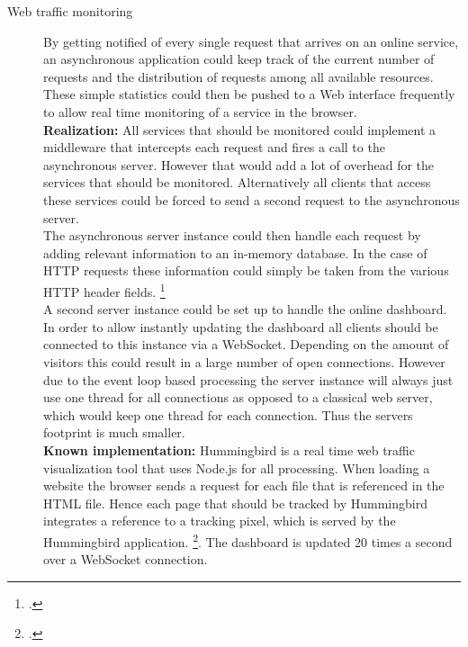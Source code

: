 \begin{description}
  \item[Web traffic monitoring] By getting notified of every single request that
  arrives on an online service, an asynchronous application could keep track of the
  current number of requests and the distribution of requests among all
  available resources. These simple statistics could then be pushed to a Web interface
  frequently to allow real time monitoring of a service in the browser.\\
  \textbf{Realization:} All services that should be monitored could implement a
  middleware that intercepts each request and fires a call to the asynchronous
  server. However that would add a lot of overhead for the services that should
  be monitored. Alternatively all clients that access these services could be forced to send a
  second request to the asynchronous server.\\
  The asynchronous server instance could then handle each request by adding
  relevant information to an in-memory database. In the case of HTTP requests
  these information could simply be taken from the various HTTP header fields.
  \footcite[Cf.][]{http_rfc}\\
  A second server instance could
  be set up to handle the online dashboard.
  In order to allow instantly updating the dashboard all clients should be
  connected to this instance via a WebSocket. Depending on the amount of visitors
  this could result in a large number of open connections. However due to the
  event loop based processing the server instance will always just use one
  thread for all connections as opposed to a classical web server, which would
  keep one thread for each connection. Thus the servers footprint is much
  smaller.\\
  \textbf{Known implementation:} Hummingbird is a real time web traffic
  visualization tool that uses Node.js for all processing. When loading a
  website the browser sends a request for each file that is referenced in the
  HTML file. Hence each page that should be tracked by Hummingbird integrates a
  reference to a tracking pixel, which is served by the Hummingbird application.
  \footcite[Cf.][]{hummingbird}. The dashboard is updated 20 times a second
  over a WebSocket connection.
  

\end{description}
